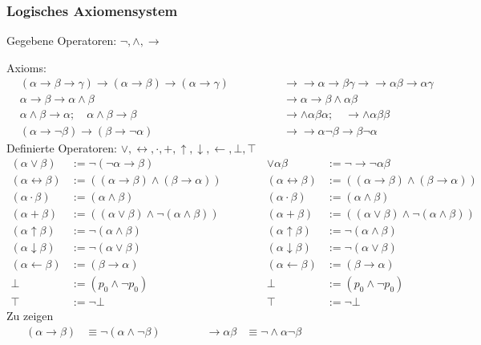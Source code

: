 \documentclass[english,ngerman,parskip=half,headsepline,footsepline,
	fleqn,notitlepage]{scrreprt}
\newcommand*{\defeq}{:=}%
\newcommand*{\ladd}{+}
\newcommand*{\lmult}{\cdot}
\newcommand*{\ltrue}{\top}%
\newcommand*{\lfalse}{\bot}%
\newcommand*{\lrep}{\leftarrow}%
\newcommand*{\limp}{\rightarrow}%
\newcommand*{\lequiv}{\leftrightarrow}%
\newcommand*{\lnand}{\uparrow}%
\newcommand*{\lnor}{\downarrow}%
\newcommand*{\formulatoleft}{&&&&&&&&&&}%
\newcommand*{\formulaspace}{&&&&}%
\newcommand*{\glsIdxPl}[1]{\glspl{#1}\idx{\gls{#1}}}%
\begin{document}
	\subsubsection{Logisches Axiomensystem}%
	\label{subsub:AussagenlogischeAxiome}
	Gegebene Operatoren: $\lnot, \land, \limp$\par
	\glsIdxPl{Axiom}:
	\begin{align}
		&(\alpha\limp\beta\limp\gamma)\limp(\alpha\limp\beta)%
			\limp(\alpha\limp\gamma)
		\formulaspace&&%
		\limp\limp\alpha\limp\beta\gamma\limp\limp\alpha\beta%
			\limp\alpha\gamma\\
		&\alpha\limp\beta\limp\alpha\land\beta
		\formulaspace&&%
		\limp\alpha\limp\beta\land\alpha\beta\\
		&\alpha\land\beta\limp\alpha ;\quad\alpha\land\beta\limp\beta
		\formulaspace&&%
		\limp\land\alpha\beta\alpha ;\quad\limp\land\alpha\beta\beta\\
		&(\alpha\limp\lnot\beta)\limp(\beta\limp\lnot\alpha)
		\formulaspace&&%
		\limp\limp\alpha\lnot\beta\limp\beta\lnot\alpha
		\formulatoleft
	\end{align}
	Definierte Operatoren: $\lor, \lequiv, \lmult, \ladd,
		\lnand, \lnor, \lrep, \lfalse, \ltrue$
	\begin{align}
		(\alpha\lor\beta)&\defeq\lnot(\lnot\alpha\limp\beta)
		\formulaspace&%
		\lor\alpha\beta&\defeq\lnot\limp\lnot\alpha\beta\\
		(\alpha\lequiv\beta)&\defeq
		((\alpha\limp\beta)\land(\beta\limp\alpha))
		\formulaspace&%
		(\alpha\lequiv\beta)&\defeq((\alpha\limp\beta)%
			\land(\beta\limp\alpha))\\
		(\alpha\lmult\beta)&\defeq(\alpha\land\beta)
		\formulaspace&%
		(\alpha\lmult\beta)&\defeq(\alpha\land\beta)\\
		(\alpha\ladd\beta)&\defeq((\alpha\lor\beta)%
			\land\lnot(\alpha\land\beta))
		\formulaspace&%
		(\alpha\ladd\beta)&\defeq((\alpha\lor\beta)%
			\land\lnot(\alpha\land\beta))\\
		(\alpha\lnand\beta)&\defeq\lnot(\alpha\land\beta)
		\formulaspace&%
		(\alpha\lnand\beta)&\defeq\lnot(\alpha\land\beta)\\
		(\alpha\lnor\beta)&\defeq\lnot(\alpha\lor\beta)
		\formulaspace&%
		(\alpha\lnor\beta)&\defeq\lnot(\alpha\lor\beta)\\
		(\alpha\lrep\beta)&\defeq(\beta\limp\alpha)
		\formulaspace&%
		(\alpha\lrep\beta)&\defeq(\beta\limp\alpha)\\
		\lfalse&\defeq(p_0\land\lnot p_0)
		\formulaspace&%
		\lfalse&\defeq(p_0\land\lnot p_0)\\
		\ltrue&\defeq\lnot\lfalse
		\formulaspace&%
		\ltrue&\defeq\lnot\lfalse
		\formulatoleft
	\end{align}
	Zu zeigen
	\begin{align}
		(\alpha\limp\beta)&\equiv\lnot(\alpha\land\lnot\beta)
		\formulaspace
		&\limp\alpha\beta&\equiv\lnot\land\alpha\lnot\beta
		\formulatoleft
	\end{align}
\end{document}
